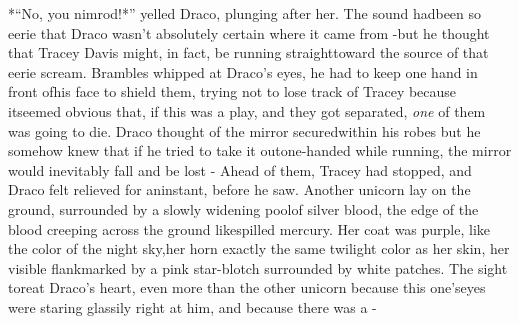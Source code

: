 *``No, you nimrod!*'' yelled Draco, plunging after her. The sound hadbeen so eerie that Draco wasn't absolutely certain where it came from -but he thought that Tracey Davis might, in fact, be running straighttoward the source of that eerie scream.
Brambles whipped at Draco's eyes, he had to keep one hand in front ofhis face to shield them, trying not to lose track of Tracey because itseemed obvious that, if this was a play, and they got separated,
\emph{one} of them was going to die. Draco thought of the mirror securedwithin his robes but he somehow knew that if he tried to take it outone-handed while running, the mirror would inevitably fall and be lost -
Ahead of them, Tracey had stopped, and Draco felt relieved for aninstant, before he saw.
Another unicorn lay on the ground, surrounded by a slowly widening poolof silver blood, the edge of the blood creeping across the ground likespilled mercury. Her coat was purple, like the color of the night sky,her horn exactly the same twilight color as her skin, her visible flankmarked by a pink star-blotch surrounded by white patches. The sight toreat Draco's heart, even more than the other unicorn because this one'seyes were staring glassily right at him, and because there was a -

